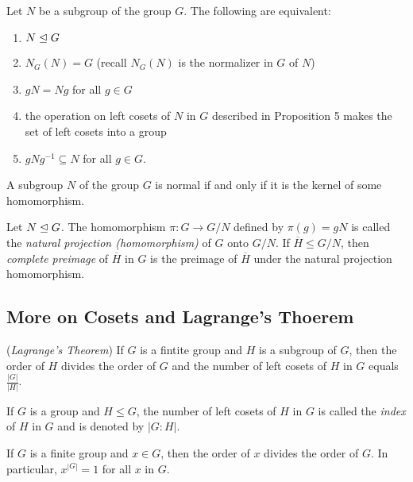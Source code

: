 \documentclass[../main]{subfiles}
\begin{document}
  
  \begin{thm}
   Let $N$ be a subgroup of the group $G$. The following are equivalent:
   \begin{enumerate}
    \item $N \trianglelefteq G$
    \item $N_G(N)=G$ (recall $N_G(N)$ is the normalizer in $G$ of $N$)
    \item $gN=Ng$ for all $g\in G$
    \item the operation on left cosets of $N$ in $G$ described in Proposition 5 makes the set of left cosets into a group
    \item $gNg^{-1} \subseteq N$ for all $g\in G$.
   \end{enumerate}
  \end{thm}
  
  
  \begin{prop}
   A subgroup $N$ of the group $G$ is normal if and only if it is the kernel of some homomorphism.
  \end{prop}
  
  
  \begin{dfn}
   Let $N \trianglelefteq G$. The homomorphism $\pi \colon G \to G/N$ defined by $\pi(g)=gN$ is called the \textit{natural projection (homomorphism)} of $G$ onto $G/N$. If $\overline{H} \leq G/N$, then \textit{complete preimage} of $\overline{H}$ in $G$ is the preimage of $\overline{H}$ under the natural projection homomorphism. 
  \end{dfn}
  
  
  \subsection{More on Cosets and Lagrange's Thoerem}
  
  
  \begin{thm}
   (\textit{Lagrange's Theorem}) If $G$ is a fintite group and $H$ is a subgroup of $G$, then the order of $H$ divides the order of $G$ and the number of left cosets of $H$ in $G$ equals $\frac{|G|}{|H|}$.
  \end{thm}
  
  
  \begin{dfn}
   If $G$ is a group and $H\leq G$, the number of left cosets of $H$ in $G$ is called the \textit{index} of $H$ in $G$ and is denoted by $|G:H|$.
  \end{dfn}
  
  
  \begin{cor}
   If $G$ is a finite group and $x\in G$, then the order of $x$ divides the order of $G$. In particular, $x^{|G|}=1$ for all $x$ in $G$.
  \end{cor}
  
\end{document}

